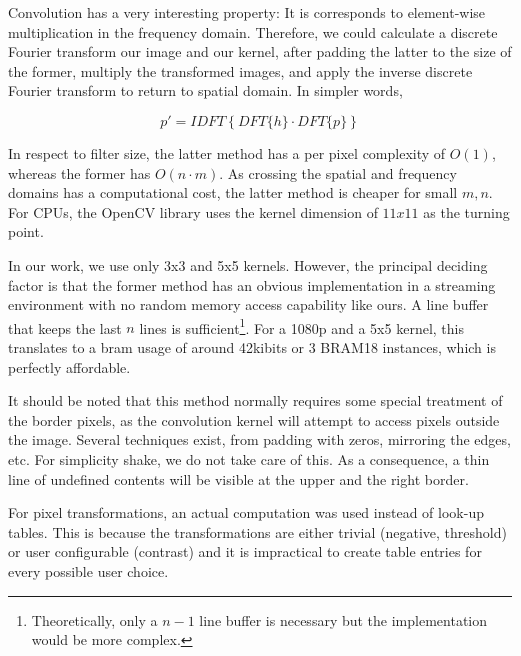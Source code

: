 Convolution has a very interesting property: It is corresponds to element-wise multiplication
in the frequency domain. Therefore, we could calculate a discrete Fourier
transform our image and our kernel, after padding the latter to the size of the former,
multiply the transformed images, and apply the inverse discrete Fourier transform
to return to spatial domain. In simpler words,

\[
	p' = IDFT\left\{ DFT\{h\} \cdot DFT\{p\} \right\}
\]

In respect to filter size, the latter method has a per pixel complexity of $O(1)$,
whereas the former has $O(n\cdot m)$. As crossing the spatial and frequency domains
has a computational cost, the latter method is cheaper for small $m,n$.
For CPUs, the OpenCV library uses the kernel dimension of $11x11$ as the turning point.

In our work, we use only 3x3 and 5x5 kernels. However, the principal deciding factor
is that the former method has an obvious implementation in a streaming environment
with no random memory access capability like ours. A line buffer that keeps the last $n$ lines
is sufficient\footnote{Theoretically, only a $n-1$ line buffer is necessary but the
implementation would be more complex.}. For a 1080p and a 5x5 kernel, this translates
to a \gls{bram} usage of around 42kibits or 3 BRAM18 instances, which is perfectly affordable.

It should be noted that this method normally requires some special treatment of the
border pixels, as the convolution kernel will attempt to access pixels outside the image.
Several techniques exist, from padding with zeros, mirroring the edges, etc.
For simplicity shake, we do not take care of this. As a consequence, a thin line 
of undefined contents will be visible at the upper and the right border.

For pixel transformations, an actual computation was used instead of look-up tables.
This is because the transformations are either trivial (negative, threshold) or
user configurable (contrast) and it is impractical to create table entries for every possible
user choice.

